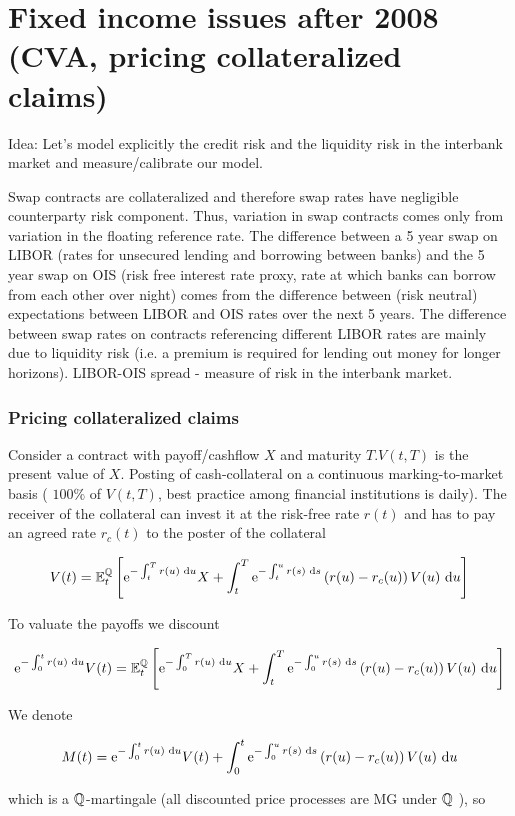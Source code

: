 \chapter{Fixed income issues after 2008 (CVA, pricing collateralized claims)}
Idea: Let's model explicitly the credit risk and the liquidity risk in the interbank market and measure/calibrate our model.

Swap contracts are collateralized and therefore swap rates have negligible counterparty risk component. Thus, variation in swap contracts comes only from variation in the floating reference rate. The difference between a 5 year swap on LIBOR (rates for unsecured lending and borrowing between banks) and the 5 year swap on OIS (risk free interest rate proxy, rate at which banks can borrow from each other over night) comes from the difference between (risk neutral) expectations between LIBOR and OIS rates over the next 5 years. The difference between swap rates on contracts referencing different LIBOR rates are mainly due to liquidity risk (i.e. a premium is required for lending out money for longer horizons). LIBOR-OIS spread - measure of risk in the interbank market.

\subsection{Pricing collateralized claims}
Consider a contract with payoff/cashflow $X$ and maturity $T . V(t, T)$ is the present value of $X$. Posting of cash-collateral on a continuous marking-to-market basis ( $100 \%$ of $V(t, T)$, best practice among financial institutions is daily). The receiver of the collateral can invest it at the risk-free rate $r(t)$ and has to pay an agreed rate $r_{c}(t)$ to the poster of the collateral

$$
V(t)=\mathbb{E}_{t}^{\mathbb{Q}}\left[\mathrm{e}^{-\int_{t}^{T} r(u) \text{ d}  u} X+\int_{t}^{T} \mathrm{e}^{-\int_{t}^{u} r(s) \text{ d}  s}\left(r(u)-r_{c}(u)\right) V(u) \text{ d}  u\right]
$$

To valuate the payoffs we discount

$$
\mathrm{e}^{-\int_{0}^{t} r(u) \text{ d}  u} V(t)=\mathbb{E}_{t}^{\mathbb{Q}}\left[\mathrm{e}^{-\int_{0}^{T} r(u) \text{ d}  u} X+\int_{t}^{T} \mathrm{e}^{-\int_{0}^{u} r(s) \text{ d}  s}\left(r(u)-r_{c}(u)\right) V(u) \text{ d}  u\right]
$$

We denote

$$
M(t)=\mathrm{e}^{-\int_{0}^{t} r(u) \text{ d}  u} V(t)+\int_{0}^{t} \mathrm{e}^{-\int_{0}^{u} r(s) \text{ d}  s}\left(r(u)-r_{c}(u)\right) V(u) \text{ d}  u
$$

which is a $\mathbb{Q}$-martingale (all discounted price processes are MG under $\mathbb{Q}$ ), so

